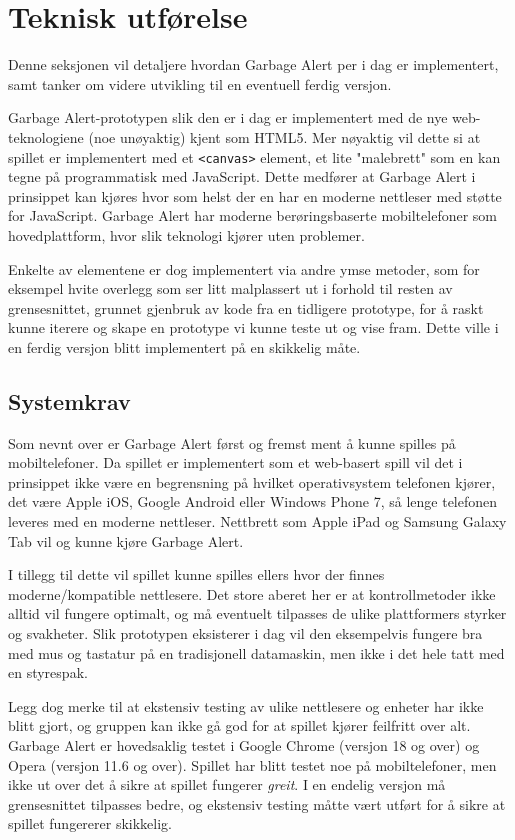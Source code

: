 \section{Teknisk utførelse}\label{sec:teknisk}
Denne seksjonen vil detaljere hvordan Garbage Alert per i dag er implementert, samt tanker om videre utvikling til en eventuell ferdig versjon.


Garbage Alert-prototypen slik den er i dag er implementert med de nye
web-teknologiene (noe unøyaktig) kjent som HTML5. Mer nøyaktig vil dette si at spillet er implementert med et \texttt{<canvas>} element, et lite "malebrett" som en kan tegne på programmatisk med JavaScript. Dette medfører at Garbage Alert i prinsippet kan kjøres hvor som helst der en har en moderne nettleser med støtte for JavaScript. Garbage Alert har moderne berøringsbaserte mobiltelefoner som hovedplattform, hvor slik teknologi kjører uten problemer.





Enkelte av elementene er dog implementert via andre ymse metoder, som for eksempel hvite overlegg som ser litt malplassert ut i forhold til resten av grensesnittet, grunnet gjenbruk av kode fra en tidligere prototype, for å raskt kunne iterere og skape en prototype vi kunne teste ut og vise fram. Dette ville i en ferdig versjon blitt implementert på en skikkelig måte.


\subsection{Systemkrav}
Som nevnt over er Garbage Alert først og fremst ment å kunne spilles på mobiltelefoner.
Da spillet er implementert som et web-basert spill vil det i prinsippet ikke være en begrensning på hvilket operativsystem telefonen kjører, det være Apple iOS, Google Android eller Windows Phone 7, så lenge telefonen leveres med en moderne nettleser. Nettbrett som Apple iPad og Samsung Galaxy Tab vil og kunne kjøre Garbage Alert.

I tillegg til dette vil spillet kunne spilles ellers hvor der finnes moderne/kompatible nettlesere. Det store aberet her er at kontrollmetoder ikke alltid vil fungere optimalt, og må eventuelt tilpasses de ulike plattformers styrker og svakheter. Slik prototypen eksisterer i dag vil den eksempelvis fungere bra med mus og tastatur på en tradisjonell datamaskin, men ikke i det hele tatt med en styrespak.

Legg dog merke til at ekstensiv testing av ulike nettlesere og enheter har ikke blitt gjort, og gruppen kan ikke gå god for at spillet kjører feilfritt over alt. Garbage Alert er hovedsaklig testet i Google Chrome (versjon 18 og over) og Opera (versjon 11.6 og over). Spillet har blitt testet noe på mobiltelefoner, men ikke ut over det å sikre at spillet fungerer \emph{greit}. I en endelig versjon må grensesnittet tilpasses bedre, og ekstensiv testing måtte vært utført for å sikre at spillet fungererer skikkelig.


